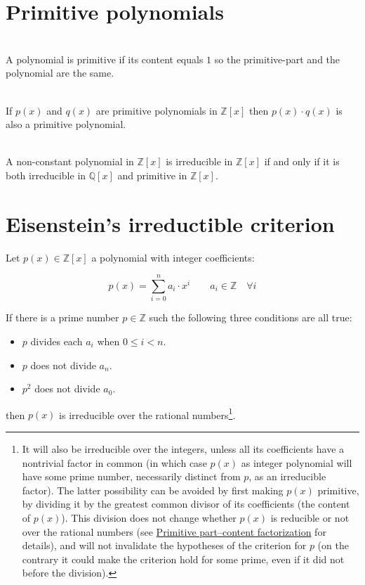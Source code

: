 \section{Primitive polynomials}

\begin{definition}
\ \\
A polynomial is primitive if its content equals $1$ so the primitive-part and the polynomial are the same.
\end{definition}

\begin{lemma}
\ \\
If $p(x)$ and $q(x)$ are primitive polynomials in $\mathbb{Z}[x]$ then $p(x) \cdot q(x)$ is also a primitive polynomial.
\end{lemma}

\begin{lemma}
\ \\
A non-constant polynomial in $\mathbb{Z}[x]$ is irreducible in $\mathbb{Z}[x]$ if and only if it is both irreducible in $\mathbb{Q}[x]$ and primitive 
in $\mathbb{Z}[x]$.
\end{lemma}

\section{Eisenstein's irreductible criterion} \label{sec:eisenstein-criterion}

Let $p(x) \in \mathbb{Z}[x]$ a polynomial with integer coefficients:

\begin{displaymath}
p(x) = \sum_{i=0}^{n} a_i \cdot x^i \qquad a_i \in \mathbb{Z} \quad \forall i
\end{displaymath}

If there is a prime number $p\in \mathbb{Z}$ such the following three conditions are all true:

\begin{itemize}
\item $p$ divides each $a_i$ when $0 \le i < n$.
\item $p$ does not divide $a_n$.
\item $p^2$ does not divide $a_0$.
\end{itemize}

then $p(x)$ is irreducible over the rational numbers\footnote{It will also be irreducible over the integers, unless all its coefficients have a nontrivial factor 
in common (in which case $p(x)$ as integer polynomial will have some prime number, necessarily distinct from $p$, as an irreducible factor). The latter 
possibility can be avoided by first making $p(x)$ primitive, by dividing it by the greatest common divisor of its coefficients (the content of $p(x)$). This 
division does not change whether $p(x)$ is reducible or not over the rational numbers (see 
\href{https://en.wikipedia.org/wiki/Factorization_of_polynomials\#Primitive_part-content_factorization}{Primitive part–content factorization} for details), 
and will not invalidate the hypotheses of the criterion for $p$ (on the contrary it could make the criterion hold for some prime, even if it did not before the 
division).}.

